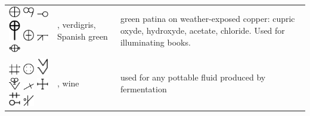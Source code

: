\documentclass[british,final,landscape]{scrartcl}
\begin{document}
\begin{refsection}
\begin{supertabular}{p{0.3\textwidth}p{0.34\textwidth}p{0.34\textwidth}}
   \includegraphics[width=5mm]{Mixtures/Verdigris} \includegraphics[width=5mm]{Mixtures/Verdigris2} \includegraphics[width=5mm]{Mixtures/Verdigris3} \includegraphics[width=5mm]{Mixtures/Verdigris4} \includegraphics[width=5mm]{Mixtures/Verdigris5} \includegraphics[width=5mm]{Mixtures/Verdigris6} \includegraphics[width=5mm]{Mixtures/Verdigris7} & , verdigris, Spanish green & green patina on weather-exposed copper: cupric oxyde, hydroxyde, acetate, chloride. Used for illuminating books. \\
   \includegraphics[width=5mm]{Mixtures/Wine} \includegraphics[width=5mm]{Mixtures/Wine2} \includegraphics[width=5mm]{Mixtures/Wine3} \includegraphics[width=5mm]{Mixtures/Wine4} \includegraphics[width=5mm]{Mixtures/Wine5} \includegraphics[width=5mm]{Mixtures/Wine6} \includegraphics[width=5mm]{Mixtures/Wine7} \includegraphics[width=5mm]{Mixtures/Wine8} & , wine & used for any pottable fluid produced by fermentation\\

\end{supertabular}
\end{refsection}
\end{document}
